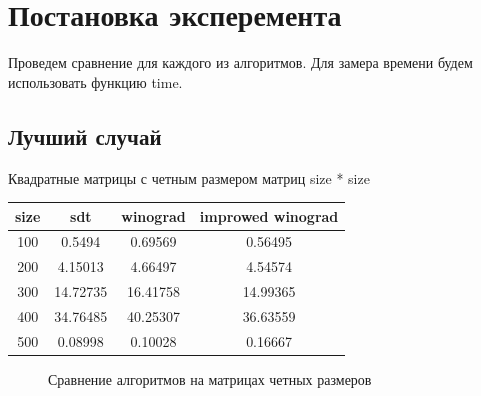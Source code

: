 \documentclass[12pt]{report}
\begin{document}
\section{Постановка эксперемента}
Проведем сравнение для каждого из алгоритмов. Для замера времени будем использовать функцию time.
\newpage
\subsection{Лучший случай}
Квадратные матрицы с четным размером матриц size * size
\begin{center}
	\begin{tabular}{|c c c c|} 
 	\hline
	size & sdt & winograd & improwed winograd \\ [0.5ex] 
 	\hline\hline
 	100 & 0.5494 & 0.69569 & 0.56495 \\
 	\hline
 	200 & 4.15013 & 4.66497 & 4.54574\\
 	\hline
	300 & 14.72735 & 16.41758 & 14.99365 \\
	\hline
	400 & 34.76485 & 40.25307 & 36.63559 \\
	\hline
	500 & 0.08998 & 0.10028 & 0.16667\\
	\hline
	\end{tabular}
\end{center}


\begin{figure}
\caption{Сравнение алгоритмов на матрицах четных размеров} \label{plot:even}
\end{figure}
\par
\end{document}
